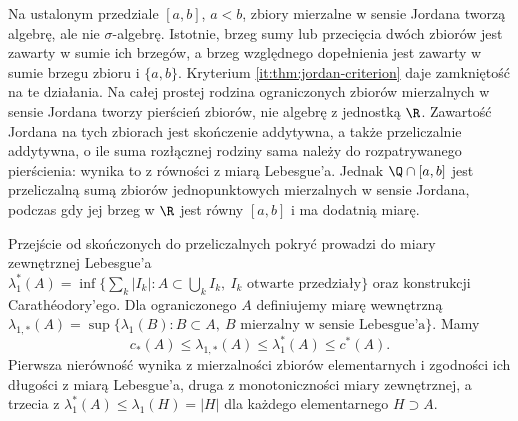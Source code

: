 Na ustalonym przedziale $[a,b]$, $a<b$, zbiory mierzalne w sensie Jordana tworzą algebrę, ale nie $\sigma$-algebrę. Istotnie, brzeg sumy lub przecięcia dwóch zbiorów jest zawarty w sumie ich brzegów, a brzeg względnego dopełnienia jest zawarty w sumie brzegu zbioru i $\{a,b\}$. Kryterium \ref{it:thm:jordan-criterion} daje zamkniętość na te działania. Na całej prostej rodzina ograniczonych zbiorów mierzalnych w sensie Jordana tworzy pierścień zbiorów, nie algebrę z jednostką $\R$. Zawartość Jordana na tych zbiorach jest skończenie addytywna, a także przeliczalnie addytywna, o ile suma rozłącznej rodziny sama należy do rozpatrywanego pierścienia: wynika to z równości z miarą Lebesgue'a. Jednak $\Q\cap[a,b]$ jest przeliczalną sumą zbiorów jednopunktowych mierzalnych w sensie Jordana, podczas gdy jej brzeg w $\R$ jest równy $[a,b]$ i ma dodatnią miarę.

Przejście od skończonych do przeliczalnych pokryć prowadzi do miary zewnętrznej Lebesgue'a $\lambda_1^*(A)=\inf\{\sum_k|I_k|:A\subset\bigcup_k I_k,\ I_k\text{ otwarte przedziały}\}$ oraz konstrukcji Carathéodory'ego. Dla ograniczonego $A$ definiujemy miarę wewnętrzną $\lambda_{1,*}(A)=\sup\{\lambda_1(B):B\subset A,\ B\text{ mierzalny w sensie Lebesgue'a}\}$. Mamy
\[
 c_*(A)\le\lambda_{1,*}(A)\le\lambda_1^*(A)\le c^*(A).
\]
Pierwsza nierówność wynika z mierzalności zbiorów elementarnych i zgodności ich długości z miarą Lebesgue'a, druga z monotoniczności miary zewnętrznej, a trzecia z $\lambda_1^*(A)\le\lambda_1(H)=|H|$ dla każdego elementarnego $H\supset A$.

